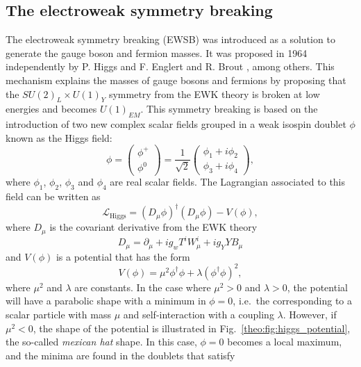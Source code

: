 \documentclass[../main.tex]{subfiles}
\begin{document}
\subsection{The electroweak symmetry breaking}
\label{theo:subsec:ewsb}

The electroweak symmetry breaking (EWSB) was introduced as a solution to ge\-ne\-ra\-te the gauge boson and fermion masses. It was proposed in 1964 independently by P. Higgs \cite{intro:theo:peter_higgs} and F. Englert and R. Brout \cite{intro:theo:englert_brout}, among others. This mechanism explains the masses of gauge bosons and fermions by proposing that the $SU(2)_L\times U(1)_Y$ symmetry from the EWK theory is broken at low energies and becomes $U(1)_{EM}$. This symmetry breaking is based on the introduction of two new complex scalar fields grouped in a weak isospin doublet $\phi$ known as the Higgs field:
\begin{equation}
\phi = 
\left(
\begin{matrix}
\phi^+ \\
\phi^0
\end{matrix}
\right)
= 
\frac{1}{\sqrt{2}}
\left(
\begin{matrix}
\phi_1 + i\phi_2 \\
\phi_3 + i\phi_4 
\end{matrix}
\right),
\end{equation}
where $\phi_1$, $\phi_2$, $\phi_3$ and $\phi_4$ are real scalar fields. The Lagrangian associated to this field can be written as
\begin{equation}
\label{theo:eq:higgs_lagrangian}
\mathcal{L}_{\text{Higgs}} = (D_\mu\phi)^\dag (D_\mu\phi) - V(\phi),
\end{equation}
where $D_\mu$ is the covariant derivative from the EWK theory
\begin{equation}
D_\mu = \partial_\mu + ig_w T^i W_\mu^i + i g_Y Y B_\mu
\end{equation}
and $V(\phi)$ is a potential that has the form
\begin{equation}
V(\phi) = \mu^2\phi^\dag\phi + \lambda(\phi^\dagger\phi)^2,
\end{equation}
where $\mu^2$ and $\lambda$ are constants. In the case where $\mu^2>0$ and $\lambda>0$, the potential will have a parabolic shape with a minimum in $\phi=0$, i.e.~the corresponding to a scalar particle with mass $\mu$ and self-interaction with a coupling $\lambda$. However, if $\mu^2<0$, the shape of the potential is illustrated in Fig.~\ref{theo:fig:higgs_potential}, the so-called \textit{mexican hat} shape. In this case, $\phi=0$ becomes a local maximum, and the minima are found in the doublets that satisfy
\end{document}
